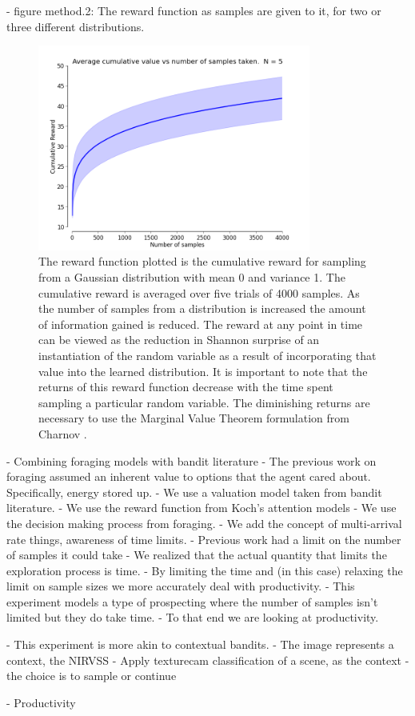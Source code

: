 	- figure method.2: The reward function as samples are given to it, for two or three different distributions.

\begin{figure}[htpd!]
	\centering
	\includegraphics[width=0.8\textwidth]{images/cumulative-reward.png}
	\caption{The reward function plotted is the cumulative reward for sampling from a Gaussian distribution with mean 0 and variance 1.  The cumulative reward is averaged over five trials of 4000 samples.  As the number of samples from a distribution is increased the amount of information gained is reduced.  The reward at any point in time can be viewed as the reduction in Shannon surprise of an instantiation of the random variable as a result of incorporating that value into the learned distribution.  It is important to note that the returns of this reward function decrease with the time spent sampling a particular random variable.  The diminishing returns are necessary to use the Marginal Value Theorem formulation from Charnov \cite{charnov1973optimal}.}
	\label{fig:reward}
\end{figure}

	- Combining foraging models with bandit literature 
		- The previous work on foraging assumed an inherent value to
			options that the agent cared about.  Specifically, energy stored up.
		- We use a valuation model taken from bandit literature.  
		- We use the reward function from Koch's attention models
		- We use the decision making process from foraging. 
		- We add the concept of multi-arrival rate things, awareness of time limits.
	- Previous work had a limit on the number of samples it could take
		- We realized that the actual quantity that limits the exploration process
			is time.
		- By limiting the time and (in this case) relaxing the limit on sample sizes we more accurately deal with productivity.  
	- This experiment models a type of prospecting where the number of samples isn't limited but they do take time. 
	- To that end we are looking at productivity.

	-  This experiment is more akin to contextual bandits.  
	- The image represents a context, the NIRVSS 
	- Apply texturecam classification of a scene, as the context
	- the choice is to sample or continue

	- Productivity 



